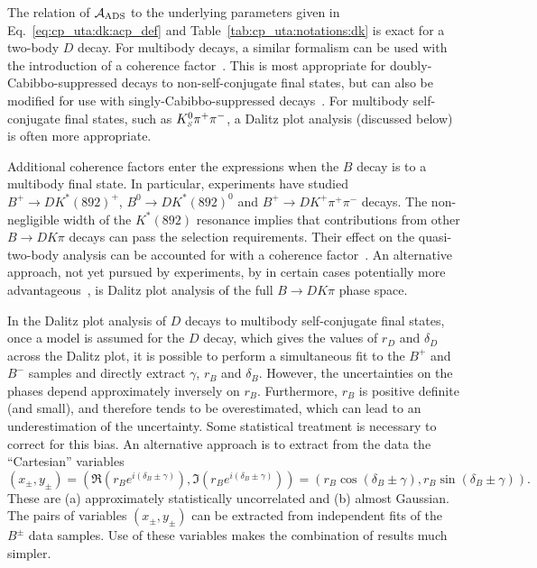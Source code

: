 The relation of ${\cal A}_{\rm ADS}$ to the underlying parameters given in Eq.~\ref{eq:cp_uta:dk:acp_def} and Table~\ref{tab:cp_uta:notations:dk} is exact for a two-body $D$ decay.  
For multibody decays, a similar formalism can be used with the introduction of a coherence factor~\cite{Atwood:2003mj}.
This is most appropriate for doubly-Cabibbo-suppressed decays to non-self-conjugate final states, but can also be modified for use with singly-Cabibbo-suppressed decays~\cite{Grossman:2002aq}.
For multibody self-conjugate final states, such as $K^0_{\scriptscriptstyle S}\pi^+\pi^-$, a Dalitz plot analysis (discussed below) is often more appropriate.

Additional coherence factors enter the expressions when the $B$ decay is to a multibody final state.
In particular, experiments have studied $B^+ \to DK^*(892)^+$, $B^0 \to DK^*(892)^0$ and $B^+ \to DK^+\pi^+\pi^-$ decays.
The non-negligible width of the $K^*(892)$ resonance implies that contributions from other $B \to DK\pi$ decays can pass the selection requirements.
Their effect on the quasi-two-body analysis can be accounted for with a coherence factor~\cite{Gronau:2002mu}.
An alternative approach, not yet pursued by experiments, by in certain cases potentially more advantageous~\cite{Gershon:2008pe,Gershon:2009qc}, is Dalitz plot analysis of the full $B \to DK\pi$ phase space.

In the Dalitz plot analysis of $D$ decays to multibody self-conjugate final states,
once a model is assumed for the $D$ decay, 
which gives the values of $r_D$ and $\delta_D$ across the Dalitz plot,
it is possible to perform a simultaneous fit to the $B^+$ and $B^-$ samples 
and directly extract $\gamma$, $r_B$ and $\delta_B$.
However, the uncertainties on the phases depend approximately inversely on $r_B$.
Furthermore, $r_B$ is positive definite (and small), 
and therefore tends to be overestimated,
which can lead to an underestimation of the uncertainty.
Some statistical treatment is necessary to correct for this bias.
An alternative approach is to extract from the data the ``Cartesian''
variables
\begin{equation}
  \left( x_\pm, y_\pm \right) = 
  \left( \Re(r_B e^{i(\delta_B\pm\gamma)}), \Im(r_B e^{i(\delta_B\pm\gamma)}) \right) = 
  \left( r_B \cos(\delta_B\pm\gamma), r_B \sin(\delta_B\pm\gamma) \right).
\end{equation}
These are (a) approximately statistically uncorrelated 
and (b) almost Gaussian.
The pairs of variables $\left( x_\pm, y_\pm \right)$ can be extracted
from independent fits of the $B^\pm$ data samples.
Use of these variables makes the combination of results much simpler.

